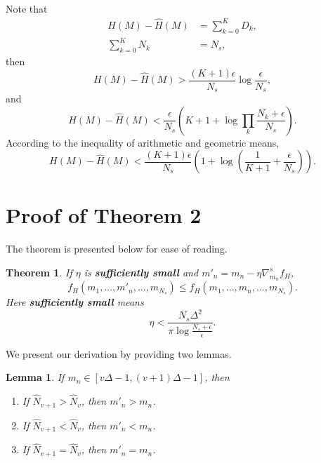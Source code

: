 \documentclass[10pt,journal,compsoc]{IEEEtran}
\newtheorem{theorem}{Theorem}
\newtheorem{lemma}{Lemma}
\begin{document}
\begin{IEEEproof}
\begin{equation}
\end{equation}
Note that
\begin{equation}
    \begin{split}
     H(M) - \hat{H}(M)&= \sum_{k=0}^K D_k, \\
     \sum_{k=0}^{K} N_k &= N_s,
    \end{split}
\end{equation}
then
\begin{equation}
    H(M) - \hat{H}(M) > \frac{(K+1)\epsilon}{N_s} \log\frac{\epsilon}{N_s},
\end{equation}
and 
\begin{equation}
    H(M) - \hat{H}(M) < \frac{\epsilon}{N_s}\left(K+1+ \log \prod_k \frac{N_k+\epsilon}{N_s}\right).
\end{equation}
According to the inequality of arithmetic and geometric means,
\begin{equation}
    H(M) - \hat{H}(M)< \frac{(K+1)\epsilon}{N_s}\left(1+\log \left(\frac{1}{K+1}+\frac{\epsilon}{N_s}\right)\right).
\end{equation}
\end{IEEEproof}

\section{Proof of Theorem 2}
\label{subsection:p2}
The theorem is presented below for ease of reading.
\begin{theorem}
\label{theorem:2}
If $\eta$ is \textbf{sufficiently small} and $m'_n = m_n - \eta \nabla^s_{m_n}f_H$,
\begin{equation}
    f_H(m_1,...,m'_n,...,m_{N_s}) \le f_H(m_1,...,m_n,...,m_{N_s}).
\end{equation}
Here \textbf{sufficiently small} means
\begin{equation}
\label{eqa:ss}
    \eta < \frac{N_s\Delta^2}{\pi \log\frac{N_s+\epsilon}{\epsilon}}.
\end{equation}
\end{theorem}
We present our derivation by providing two lemmas. 
\begin{lemma}
\label{lemma:1}
If $m_n \in [v\Delta-1, (v+1)\Delta-1]$, then 
\begin{enumerate}
    \item If $\hat{N}_{v+1} > \hat{N}_{v}$, then $m'_n > m_n$.
    \item If $\hat{N}_{v+1} < \hat{N}_{v}$, then $m'_n < m_n$.
    \item If $\hat{N}_{v+1} = \hat{N}_{v}$, then $m'_n = m_n$.
\end{enumerate}
\end{lemma}
\end{document}
